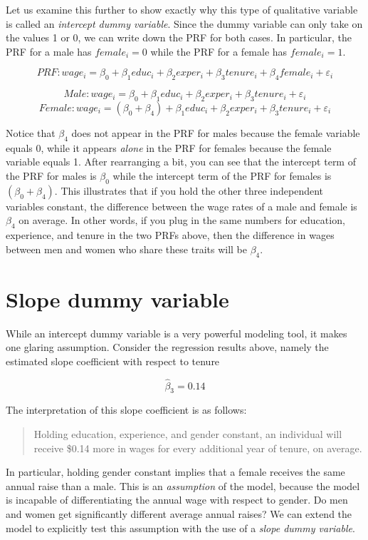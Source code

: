 \documentclass[
]{book}
\begin{document}
Let us examine this further to show exactly why this type of qualitative variable is called an \emph{intercept dummy variable}. Since the dummy variable can only take on the values 1 or 0, we can write down the PRF for both cases. In particular, the PRF for a male has \(female_i = 0\) while the PRF for a female has \(female_i = 1\).

\[PRF: wage_i=\beta_0+\beta_1educ_i+\beta_2exper_i+\beta_3tenure_i+\beta_4female_i+\varepsilon_i\]

\[Male: wage_i=\beta_0+\beta_1educ_i+\beta_2exper_i+\beta_3tenure_i+\varepsilon_i\]
\[Female: wage_i=(\beta_0+\beta_4)+\beta_1educ_i+\beta_2exper_i+\beta_3tenure_i+\varepsilon_i\]

Notice that \(\beta_4\) does not appear in the PRF for males because the female variable equals 0, while it appears \emph{alone} in the PRF for females because the female variable equals 1. After rearranging a bit, you can see that the intercept term of the PRF for males is \(\beta_0\) while the intercept term of the PRF for females is \((\beta_0+\beta_4)\). This illustrates that if you hold the other three independent variables constant, the difference between the wage rates of a male and female is \(\beta_4\) on average. In other words, if you plug in the same numbers for education, experience, and tenure in the two PRFs above, then the difference in wages between men and women who share these traits will be \(\beta_4\).

\hypertarget{slope-dummy-variable}{%
\section{Slope dummy variable}\label{slope-dummy-variable}}

While an intercept dummy variable is a very powerful modeling tool, it makes one glaring assumption. Consider the regression results above, namely the estimated slope coefficient with respect to tenure

\[\hat{\beta}_3 = 0.14\]

The interpretation of this slope coefficient is as follows:

\begin{quote}
Holding education, experience, and gender constant, an individual will receive \$0.14 more in wages for every additional year of tenure, on average.
\end{quote}

In particular, holding gender constant implies that a female receives the same annual raise than a male. This is an \emph{assumption} of the model, because the model is incapable of differentiating the annual wage with respect to gender. Do men and women get significantly different average annual raises? We can extend the model to explicitly test this assumption with the use of a \emph{slope dummy variable}.
\end{document}
